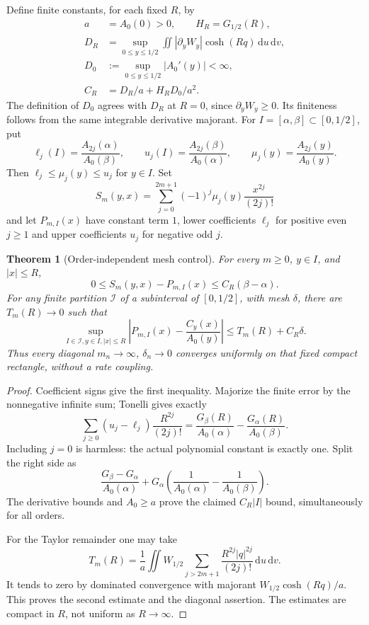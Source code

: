 \documentclass[11pt]{article}
\newtheorem{theorem}{Theorem}
\theoremstyle{remark}\newtheorem{remark}[theorem]{Remark}
\newcommand{\dd}{\,\mathrm d}
\begin{document}
Define finite constants, for each fixed $R$, by
\begin{align*}
 a&=A_0(0)>0,\qquad H_R=G_{1/2}(R),\\
 D_R&=\sup_{0\le y\le1/2}\iint |\partial_yW_y|\cosh(Rq)\dd u\dd v,\\
 D_0&:=\sup_{0\le y\le1/2}|A_0'(y)|<\infty,\\
 C_R&=D_R/a+H_RD_0/a^2.
\end{align*}
The definition of $D_0$ agrees with $D_R$ at $R=0$, since
$\partial_yW_y\ge0$. Its finiteness follows from the same integrable
derivative majorant.
For $I=[\alpha,\beta]\subset[0,1/2]$, put
\[
 \ell_j(I)=\frac{A_{2j}(\alpha)}{A_0(\beta)},\qquad
 u_j(I)=\frac{A_{2j}(\beta)}{A_0(\alpha)},\qquad
 \mu_j(y)=\frac{A_{2j}(y)}{A_0(y)}.
\]
Then $\ell_j\le\mu_j(y)\le u_j$ for $y\in I$. Set
\[
 S_m(y,x)=\sum_{j=0}^{2m+1}(-1)^j\mu_j(y)\frac{x^{2j}}{(2j)!}
\]
and let $P_{m,I}(x)$ have constant term $1$, lower coefficients $\ell_j$
for positive even $j\ge1$ and upper coefficients $u_j$ for negative odd $j$.

\begin{theorem}[Order-independent mesh control]\label{thm:mesh}
For every $m\ge0$, $y\in I$, and $|x|\le R$,
\[
 0\le S_m(y,x)-P_{m,I}(x)\le C_R(\beta-\alpha).
\]
For any finite partition $\mathcal I$ of a subinterval of $[0,1/2]$,
with mesh $\delta$, there are $T_m(R)\to0$ such that
\[
 \sup_{I\in\mathcal I,y\in I,|x|\le R}
 \left|P_{m,I}(x)-\frac{C_y(x)}{A_0(y)}\right|
 \le T_m(R)+C_R\delta.
\]
Thus every diagonal $m_n\to\infty$, $\delta_n\to0$ converges uniformly
on that fixed compact rectangle, without a rate coupling.
\end{theorem}
\begin{proof}
Coefficient signs give the first inequality. Majorize the finite error
by the nonnegative infinite sum; Tonelli gives exactly
\[
 \sum_{j\ge0}(u_j-\ell_j)\frac{R^{2j}}{(2j)!}
 =\frac{G_\beta(R)}{A_0(\alpha)}-\frac{G_\alpha(R)}{A_0(\beta)}.
\]
Including $j=0$ is harmless: the actual polynomial constant is exactly
one. Split the right side as
\[
 \frac{G_\beta-G_\alpha}{A_0(\alpha)}+
 G_\alpha\left(\frac1{A_0(\alpha)}-\frac1{A_0(\beta)}\right).
\]
The derivative bounds and $A_0\ge a$ prove the claimed $C_R|I|$ bound,
simultaneously for all orders.

For the Taylor remainder one may take
\[
 T_m(R)=\frac1a\iint W_{1/2}
       \sum_{j>2m+1}\frac{R^{2j}|q|^{2j}}{(2j)!}\dd u\dd v.
\]
It tends to zero by dominated convergence with majorant
$W_{1/2}\cosh(Rq)/a$. This proves the second estimate and the diagonal
assertion. The estimates are compact in $R$, not uniform as $R\to\infty$.
\end{proof}
\end{document}
